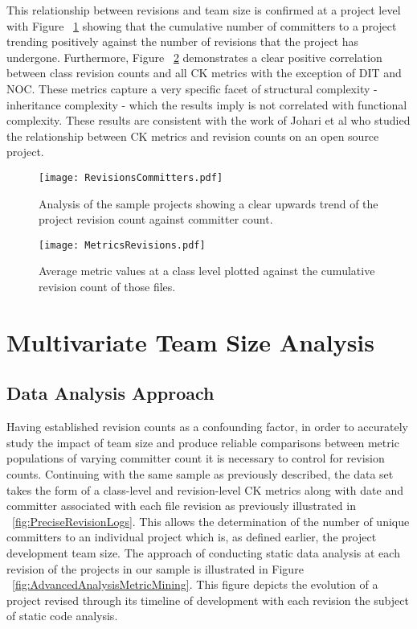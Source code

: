 This relationship between revisions and team size is confirmed at a project level with Figure ~\ref{fig:RevisionsCommitters} showing that the cumulative number of committers to a project trending positively against the number of revisions that the project has undergone. Furthermore, Figure ~\ref{fig:MetricsRevisions} demonstrates a clear positive correlation between class revision counts and all CK metrics with the exception of DIT and NOC. These metrics capture a very specific facet of structural complexity - inheritance complexity - which the results imply is not correlated with functional complexity. These results are consistent with the work of Johari et al \citep{johari2012validation} who studied the relationship between CK metrics and revision counts on an open source project. 

\begin{figure}[htbp!] 
\centering    
\texttt{[image: RevisionsCommitters.pdf]}
\caption{Analysis of the sample projects showing a clear upwards trend of the project revision count against committer count.}
\label{fig:RevisionsCommitters}
\end{figure}

\begin{figure}[htbp!] 
\centering    
\texttt{[image: MetricsRevisions.pdf]}
\caption{Average metric values at a class level plotted against the cumulative revision count of those files.}
\label{fig:MetricsRevisions}
\end{figure}

\section{Multivariate Team Size Analysis} %

\subsection{Data Analysis Approach}
Having established revision counts as a confounding factor, in order to accurately study the impact of team size and produce reliable comparisons between metric populations of varying committer count it is necessary to control for revision counts. Continuing with the same sample as previously described, the data set takes the form of a class-level and revision-level CK metrics along with date and committer associated with each file revision as previously illustrated in ~\ref{fig:PreciseRevisionLogs}. This allows the determination of the number of unique committers to an individual project which is, as defined earlier, the project development team size. The approach of conducting static data analysis at each revision of the projects in our sample is illustrated in Figure ~\ref{fig:AdvancedAnalysisMetricMining}. This figure depicts the evolution of a project revised through its timeline of development with each revision the subject of static code analysis. 

